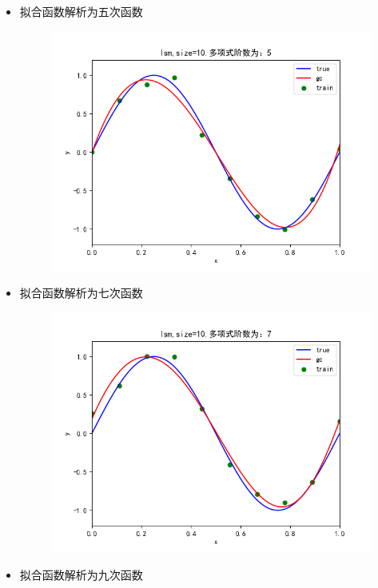\documentclass[lang=cn,a4paper,cite=authoryear]{elegantpaper}
\begin{document}
\begin{itemize}
\begin{figure}[H]
	\end{figure}
	\item 拟合函数解析为五次函数
	\begin{figure}[H]
		\centering
		\includegraphics[scale=0.5]{gc5}
	\end{figure}
	\item 拟合函数解析为七次函数
	\begin{figure}[H]
		\centering
		\includegraphics[scale=0.5]{gc7}
	\end{figure}
	\item 拟合函数解析为九次函数
	\begin{figure}[H]
		\centering

\end{figure}
\end{itemize}
\end{document}
